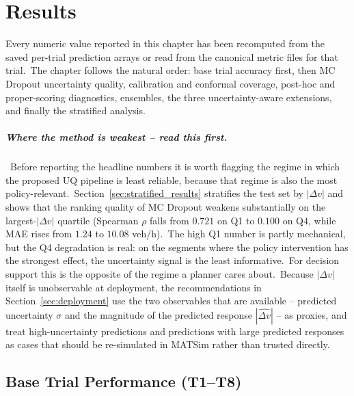 
\chapter{Results}\label{chapter:results}

Every numeric value reported in this chapter has been recomputed from the saved per-trial prediction arrays or read from the canonical metric files for that trial.\ The chapter follows the natural order: base trial accuracy first, then MC Dropout uncertainty quality, calibration and conformal coverage, post-hoc and proper-scoring diagnostics, ensembles, the three uncertainty-aware extensions, and finally the stratified analysis.

\paragraph{Where the method is weakest -- read this first.}\ Before reporting the headline numbers it is worth flagging the regime in which the proposed UQ pipeline is least reliable, because that regime is also the most policy-relevant.\ Section~\ref{sec:stratified_results} stratifies the test set by $|\Delta v|$ and shows that the ranking quality of MC Dropout weakens substantially on the largest-$|\Delta v|$ quartile (Spearman $\rho$ falls from $0.721$ on Q1 to $0.100$ on Q4, while MAE rises from $1.24$ to $10.08$ veh/h).\ The high Q1 number is partly mechanical, but the Q4 degradation is real: on the segments where the policy intervention has the strongest effect, the uncertainty signal is the least informative.\ For decision support this is the opposite of the regime a planner cares about.\ Because $|\Delta v|$ itself is unobservable at deployment, the recommendations in Section~\ref{sec:deployment} use the two observables that are available -- predicted uncertainty $\sigma$ and the magnitude of the predicted response $|\widehat{\Delta v}|$ -- as proxies, and treat high-uncertainty predictions and predictions with large predicted responses as cases that should be re-simulated in MATSim rather than trusted directly.

\section{Base Trial Performance (T1--T8)}\label{sec:trial_results}


